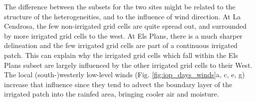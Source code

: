 The difference between the subsets for the two sites might be related to the structure of the heterogeneities, and to the influence of wind direction.
At La Cendrosa, the few non-irrigated grid cells are quite spread out, and surrounded by more irrigated grid cells to the west. At Els Plans, there is a much sharper delineation and the few irrigated grid cells are part of a continuous irrigated patch. 
This can explain why the irrigated grid cells which fall within the Els Plans subset are largely influenced by the other irrigated grid cells to their West. 
The local (south-)westerly low-level winds (Fig. \ref{fig:iop_days_winds}a, c, e, g) increase that influence since they tend to advect the boundary layer of the irrigated patch into the rainfed area, bringing cooler air and moisture.

\hfill

